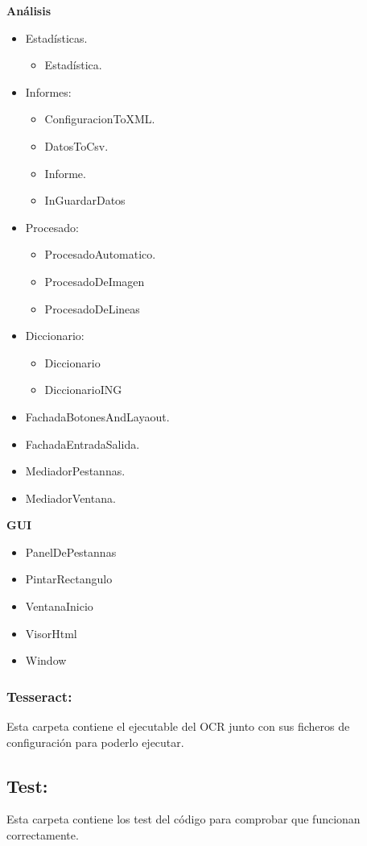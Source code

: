 \textbf{Análisis}
\begin{itemize}
	\item Estadísticas.
		\begin{itemize}
			\item Estadística.
		\end{itemize}
	\item Informes:
		\begin{itemize}
			\item ConfiguracionToXML.
			\item DatosToCsv.
			\item Informe.
			\item InGuardarDatos
		\end{itemize}
	\item Procesado:
		\begin{itemize}
			\item ProcesadoAutomatico.
			\item ProcesadoDeImagen
			\item ProcesadoDeLineas
		\end{itemize}
	\item Diccionario:
		\begin{itemize}
			\item Diccionario
			\item DiccionarioING
		\end{itemize}
	\item FachadaBotonesAndLayaout.
	\item FachadaEntradaSalida.	
	\item MediadorPestannas.
	\item MediadorVentana.
\end{itemize}	

\textbf{GUI}
\begin{itemize}
		\item PanelDePestannas
		\item PintarRectangulo
		\item VentanaInicio
		\item VisorHtml
		\item Window
\end{itemize}

\subsubsection{Tesseract:}
Esta carpeta contiene el ejecutable del OCR junto con sus ficheros de configuración para poderlo ejecutar.

\subsection{Test:}
Esta carpeta contiene los test del código para comprobar que funcionan correctamente.
